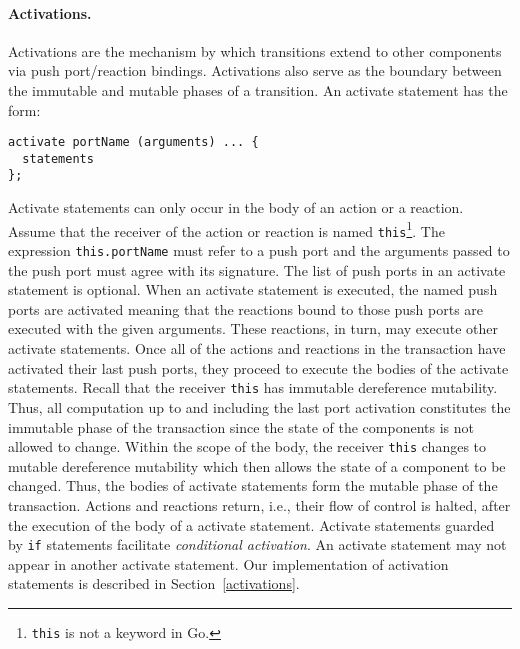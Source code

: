 \paragraph{Activations.}
Activations are the mechanism by which transitions extend to other components via push port/reaction bindings.
Activations also serve as the boundary between the immutable and mutable phases of a transition.
An activate statement has the form:
\begin{verbatim}
activate portName (arguments) ... {
  statements
};
\end{verbatim}
Activate statements can only occur in the body of an action or a reaction.
Assume that the receiver of the action or reaction is named \verb+this+\footnote{\verb+this+ is not a keyword in Go.}.
The expression \verb+this.portName+ must refer to a push port and the arguments passed to the push port must agree with its signature.
The list of push ports in an activate statement is optional.
When an activate statement is executed, the named push ports are activated meaning that the reactions bound to those push ports are executed with the given arguments.
These reactions, in turn, may execute other activate statements.
Once all of the actions and reactions in the transaction have activated their last push ports, they proceed to execute the bodies of the activate statements.
Recall that the receiver \verb+this+ has immutable dereference mutability.
Thus, all computation up to and including the last port activation constitutes the immutable phase of the transaction since the state of the components is not allowed to change.
Within the scope of the body, the receiver \verb+this+ changes to mutable dereference mutability which then allows the state of a component to be changed.
Thus, the bodies of activate statements form the mutable phase of the transaction.
Actions and reactions return, i.e., their flow of control is halted, after the execution of the body of a activate statement.
Activate statements guarded by \verb+if+ statements facilitate \emph{conditional activation}.
An activate statement may not appear in another activate statement.
Our implementation of activation statements is described in Section~\ref{activations}.

